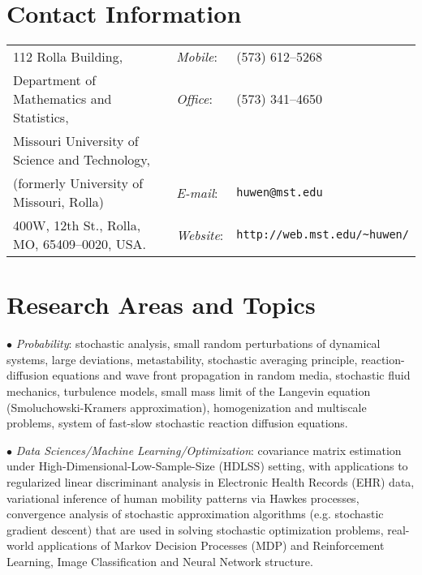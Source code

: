 \documentclass[margin,line]{res}
\begin{document}
\pagestyle{plain}



\begin{resume}
\section{\sc Contact Information}
\vspace{.05in}
\begin{tabular}{@{}p{3in}p{0.45in}p{2in}}
112 Rolla Building,                                 & {\it Mobile}:     & (573) 612--5268                                         \\
Department of Mathematics and Statistics,           & {\it Office}:     & (573) 341--4650                                         \\
Missouri University of Science and Technology,      &                                                                             \\
(formerly University of Missouri, Rolla)            & {\it E-mail}:     & \verb"huwen@mst.edu"                                    \\
400W, 12th St., Rolla, MO, 65409--0020, USA.        & {\it Website}:    & \verb"http://web.mst.edu/~huwen/"
\end{tabular}






\section{\sc Research Areas and Topics}

$\bullet$ \textit{Probability}: stochastic analysis, small random perturbations of dynamical systems, large deviations, metastability, stochastic averaging principle, reaction-diffusion equations and wave front propagation in random media, stochastic fluid mechanics, turbulence models, small mass limit of the Langevin equation (Smoluchowski-Kramers approximation), homogenization and multiscale problems, system of fast-slow stochastic reaction diffusion equations.

$\bullet$ \textit{Data Sciences/Machine Learning/Optimization}: covariance matrix estimation under High-Dimensional-Low-Sample-Size (HDLSS) setting, with applications to regularized linear discriminant analysis in Electronic Health Records (EHR) data, variational inference of human mobility patterns via Hawkes processes, convergence analysis of stochastic approximation algorithms (e.g. stochastic gradient descent) that are used in solving stochastic optimization problems, real-world applications of Markov Decision Processes (MDP) and Reinforcement Learning, Image Classification and Neural Network structure.


\end{resume}
\end{document}
